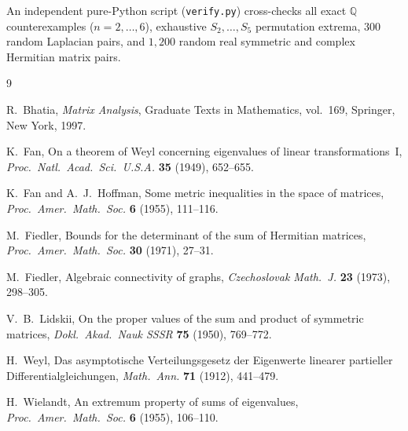 \documentclass[11pt,a4paper]{article}
\theoremstyle{plain}
\theoremstyle{definition}
\newcommand{\Q}{\mathbb{Q}}
\begin{document}
An independent pure-Python script (\texttt{verify.py}) cross-checks all exact $\Q$ counterexamples ($n = 2,\dots,6$), exhaustive $S_2,\dots,S_5$ permutation extrema, $300$ random Laplacian pairs, and $1{,}200$ random real symmetric and complex Hermitian matrix pairs.

\begin{thebibliography}{9}

R.~Bhatia, \emph{Matrix Analysis}, Graduate Texts in Mathematics, vol.~169, Springer, New York, 1997.

K.~Fan, On a theorem of Weyl concerning eigenvalues of linear transformations~I, \emph{Proc.\ Natl.\ Acad.\ Sci.\ U.S.A.} \textbf{35} (1949), 652--655.

K.~Fan and A.~J.~Hoffman, Some metric inequalities in the space of matrices, \emph{Proc.\ Amer.\ Math.\ Soc.} \textbf{6} (1955), 111--116.

M.~Fiedler, Bounds for the determinant of the sum of Hermitian matrices, \emph{Proc.\ Amer.\ Math.\ Soc.} \textbf{30} (1971), 27--31.

M.~Fiedler, Algebraic connectivity of graphs, \emph{Czechoslovak Math.\ J.} \textbf{23} (1973), 298--305.

V.~B.~Lidskii, On the proper values of the sum and product of symmetric matrices, \emph{Dokl.\ Akad.\ Nauk SSSR} \textbf{75} (1950), 769--772.

H.~Weyl, Das asymptotische Verteilungsgesetz der Eigenwerte linearer partieller Differentialgleichungen, \emph{Math.\ Ann.} \textbf{71} (1912), 441--479.

H.~Wielandt, An extremum property of sums of eigenvalues, \emph{Proc.\ Amer.\ Math.\ Soc.} \textbf{6} (1955), 106--110.

\end{thebibliography}
\end{document}

